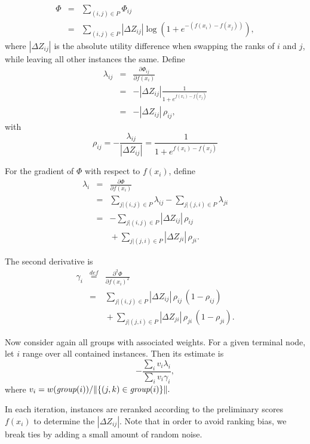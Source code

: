 \documentclass{article}
\begin{document}
\begin{eqnarray*}
\Phi & = & \sum_{(i,j) \in P} \Phi_{ij}\\
 & = & \sum_{(i,j) \in P} |\Delta Z_{ij}| \log \left( 1 + e^{-(f(x_i) -
    f(x_j))}\right),
\end{eqnarray*}
where $|\Delta Z_{ij}|$ is the absolute utility difference when
swapping the ranks of $i$ and $j$, while leaving all other instances
the same. Define
\begin{eqnarray*}
  \lambda_{ij} & = & \frac{\partial\Phi_{ij}}{\partial f(x_i)}\\
  & = & - |\Delta Z_{ij}| \frac{1}{1 + e^{f(x_i) - f(x_j)}}\\
&   = & - |\Delta Z_{ij}| \, \rho_{ij},
\end{eqnarray*}
with
$$   \rho_{ij} = - \frac{\lambda_{ij }}{|\Delta Z_{ij}|} = \frac{1}{1 + e^{f(x_i) - f(x_j)}}$$

 For the gradient of $\Phi$ with respect to $f(x_i)$, define
\begin{eqnarray*}
\lambda_i & = & \frac{\partial \Phi}{\partial f(x_i)}\\
& = &  \sum_{j|(i,j) \in P} \lambda_{ij} - \sum_{j|(j,i) \in P} \lambda_{ji}\\
& = &   - \sum_{j|(i,j) \in P} |\Delta Z_{ij}| \, \rho_{ij}\\
&  & \mbox{}  + \sum_{j|(j,i) \in P} |\Delta Z_{ji}| \, \rho_{ji}.
\end{eqnarray*}

 The second derivative is
\begin{eqnarray*}
   \gamma_i &  \stackrel{def}{=} &  \frac{\partial^2\Phi}{\partial f(x_i)^2}\\
    & = &  \sum_{j|(i,j) \in P} |\Delta Z_{ij}| \, \rho_{ij} \, (1-\rho_{ij})\\
&  &  \mbox{} + \sum_{j|(j,i) \in P} |\Delta Z_{ji}| \, \rho_{ji} \, (1-\rho_{ji}).
\end{eqnarray*}

Now consider again all groups with associated weights. For a given
terminal node, let $i$ range over all contained instances. Then its
estimate is
$$-\frac{\sum_i v_i\lambda_{i}}{\sum_i v_i \gamma_i},$$ where
$v_i=w(\mbox{\em group}(i))/\|\{(j,k)\in\mbox{\em group}(i)\}\|.$

In each iteration, instances are reranked according to the preliminary
scores $f(x_i)$ to determine the $|\Delta Z_{ij}|$. Note that in order
to avoid ranking bias, we break ties by adding a small amount of
random noise.
\end{document}
